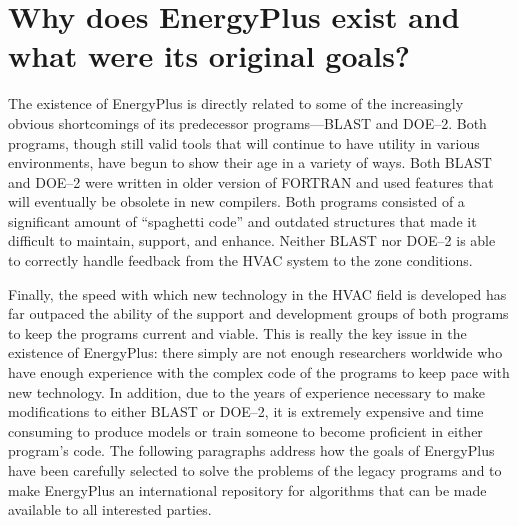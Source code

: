 \section{Why does EnergyPlus exist and what were its original goals?}\label{why-does-energyplus-exist-and-what-were-its-original-goals}

The existence of EnergyPlus is directly related to some of the increasingly obvious shortcomings of its predecessor programs---BLAST and DOE--2. Both programs, though still valid tools that will continue to have utility in various environments, have begun to show their age in a variety of ways. Both BLAST and DOE--2 were written in older version of FORTRAN and used features that will eventually be obsolete in new compilers. Both programs consisted of a significant amount of ``spaghetti code'' and outdated structures that made it difficult to maintain, support, and enhance. Neither BLAST nor DOE--2 is able to correctly handle feedback from the HVAC system to the zone conditions.

Finally, the speed with which new technology in the HVAC field is developed has far outpaced the ability of the support and development groups of both programs to keep the programs current and viable. This is really the key issue in the existence of EnergyPlus: there simply are not enough researchers worldwide who have enough experience with the complex code of the programs to keep pace with new technology. In addition, due to the years of experience necessary to make modifications to either BLAST or DOE--2, it is extremely expensive and time consuming to produce models or train someone to become proficient in either program's code. The following paragraphs address how the goals of EnergyPlus have been carefully selected to solve the problems of the legacy programs and to make EnergyPlus an international repository for algorithms that can be made available to all interested parties.

